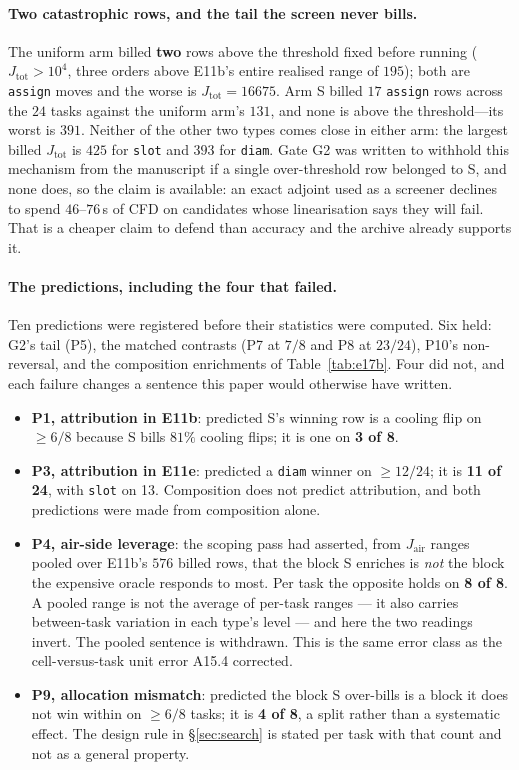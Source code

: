 \documentclass{article}
\newcommand{\Jtot}{J_{\mathrm{tot}}}
\begin{document}
\paragraph{Two catastrophic rows, and the tail the screen never bills.}
The uniform arm billed \textbf{two} rows above the threshold fixed before running
($\Jtot > 10^4$, three orders above E11b's entire realised range of $195$); both are
\texttt{assign} moves and the worse is $\Jtot = 16675$.  Arm S billed $17$
\texttt{assign} rows across the $24$ tasks against the uniform arm's $131$, and none
is above the threshold---its worst is $391$.  Neither of the other two types comes
close in either arm: the largest billed $\Jtot$ is $425$ for \texttt{slot} and $393$
for \texttt{diam}.  Gate G2 was written to withhold this mechanism from the manuscript
if a single over-threshold row belonged to S, and none does, so the claim is
available: an exact adjoint used as a screener declines to spend $46$--$76$\,s of CFD
on candidates whose linearisation says they will fail.  That is a cheaper claim to
defend than accuracy and the archive already supports it.

\paragraph{The predictions, including the four that failed.}
Ten predictions were registered before their statistics were computed.  Six held:
G2's tail (P5), the matched contrasts (P7 at $7/8$ and P8 at $23/24$), P10's
non-reversal, and the composition enrichments of Table~\ref{tab:e17b}.  Four did not, and
each failure changes a sentence this paper would otherwise have written.
\begin{itemize}\itemsep1pt
\item \textbf{P1, attribution in E11b}: predicted S's winning row is a cooling flip
on $\ge 6/8$ because S bills $81\%$ cooling flips; it is one on \textbf{3 of 8}.
\item \textbf{P3, attribution in E11e}: predicted a \texttt{diam} winner on
$\ge 12/24$; it is \textbf{11 of 24}, with \texttt{slot} on 13.  Composition does
not predict attribution, and both predictions were made from composition alone.
\item \textbf{P4, air-side leverage}: the scoping pass had asserted, from
$J_{\mathrm{air}}$ ranges pooled over E11b's $576$ billed rows, that the block S enriches is
\emph{not} the block the expensive oracle responds to most.  Per task the opposite
holds on \textbf{8 of 8}.  A pooled range is not the average of per-task ranges ---
it also carries between-task variation in each type's level --- and here the two
readings invert.  The pooled sentence is withdrawn.  This is the same error class as
the cell-versus-task unit error A15.4 corrected.
\item \textbf{P9, allocation mismatch}: predicted the block S over-bills is a block
it does not win within on $\ge 6/8$ tasks; it is \textbf{4 of 8}, a split rather than
a systematic effect.  The design rule in \S\ref{sec:search} is stated per task with
that count and not as a general property.
\end{itemize}
\end{document}
